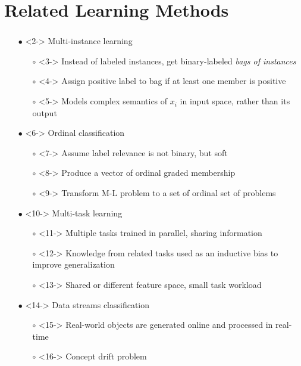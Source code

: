 \documentclass{beamer}
\begin{document}
\section{Related Learning Methods}
\begin{frame}
\frametitle{\insertsection}
\begin{itemize}
\item[$\bullet$] <2-> Multi-instance learning
\begin{itemize}
\item[$\circ$] <3-> Instead of labeled instances, get binary-labeled \emph{bags of instances}
\item[$\circ$] <4-> Assign positive label to bag if at least one member is positive
\item[$\circ$] <5-> Models complex semantics of $x_i$ in input space, rather than its output
\end{itemize}
\item[$\bullet$] <6-> Ordinal classification
\begin{itemize}
\item[$\circ$] <7-> Assume label relevance is not binary, but soft
\item[$\circ$] <8-> Produce a vector of ordinal graded membership
\item[$\circ$] <9-> Transform M-L problem to a set of ordinal set of problems
\end{itemize}
\item[$\bullet$] <10-> Multi-task learning
\begin{itemize}
\item[$\circ$] <11-> Multiple tasks trained in parallel, sharing information
\item[$\circ$] <12-> Knowledge from related tasks used as an inductive bias to improve generalization
\item[$\circ$] <13-> Shared or different feature space, small task workload
\end{itemize}
\item[$\bullet$] <14-> Data streams classification
\begin{itemize}
\item[$\circ$] <15-> Real-world objects are generated online and processed in  real-time
\item[$\circ$] <16-> Concept drift problem
\end{itemize}
\end{itemize}
\end{frame}
\end{document}

